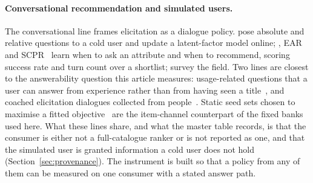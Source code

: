 \documentclass[manuscript,screen,review]{acmart}
\begin{document}
\paragraph{Conversational recommendation and simulated users.} The conversational line frames elicitation as a dialogue policy. \citet{christakopoulou2016towards} pose absolute and relative questions to a cold user and update a latent-factor model online; \citet{sun2018conversational}, EAR~\citep{lei2020estimation} and SCPR~\citep{lei2020interactive} learn when to ask an attribute and when to recommend, scoring success rate and turn count over a shortlist; \citet{jannach2021survey} survey the field. Two lines are closest to the answerability question this article measures: usage-related questions that a user can answer from experience rather than from having seen a title~\citep{kostric2024generating}, and coached elicitation dialogues collected from people~\citep{radlinski2019coached}. Static seed sets chosen to maximise a fitted objective~\citep{golbandi2010bootstrapping} are the item-channel counterpart of the fixed banks used here. What these lines share, and what the master table records, is that the consumer is either not a full-catalogue ranker or is not reported as one, and that the simulated user is granted information a cold user does not hold (Section~\ref{sec:provenance}). The instrument is built so that a policy from any of them can be measured on one consumer with a stated answer path.
\end{document}
